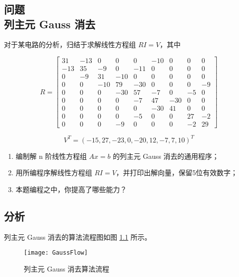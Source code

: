 \chapter[第三章]{} %
\label{cha:chapter3}

\section{问题 \\ 列主元 Gauss 消去}

对于某电路的分析，归结于求解线性方程组 $RI = V$，其中

$$
R = 
\begin{bmatrix}
31 & -13 & 0 & 0 & 0 & -10 & 0 & 0 & 0 \\
-13 & 35 & -9 & 0 & -11 & 0 & 0 & 0 & 0 \\
0 & -9 & 31 & -10 & 0 & 0 & 0 & 0 & 0 \\
0 & 0 & -10 & 79 & -30 & 0 & 0 & 0 & -9 \\
0 & 0 & 0 & -30 & 57 & -7 & 0 & -5 & 0 \\
0 & 0 & 0 & 0 & -7 & 47 & -30 & 0 & 0 \\
0 & 0 & 0 & 0 & 0 & -30 & 41 & 0 & 0 \\
0 & 0 & 0 & 0 & -5 & 0 & 0 & 27 & -2 \\
0 & 0 & 0 & -9 & 0 & 0 & 0 & -2 & 29
\end{bmatrix}
$$

$$
V^T = (-15, 27, -23, 0, -20, 12, -7, 7, 10)^T
$$

\begin{enumerate}
    \item 编制解 n 阶线性方程组 $Ax = b$ 的列主元 Gauss 消去的通用程序；

    \item 用所编程序解线性方程组 $RI = V$，并打印出解向量，保留5位有效数字；

    \item 本题编程之中，你提高了哪些能力？

\end{enumerate}

\section{分析}

列主元 Gauss 消去的算法流程图如图 \ref{fig:GaussFlow} 所示。

  \begin{figure}[ht]
  \centering
    \texttt{[image: GaussFlow]}
    \caption{列主元 Gauss 消去算法流程}
    \label{fig:GaussFlow}
  \end{figure}

